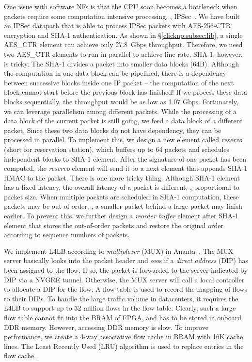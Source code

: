 One issue with software NFs is that the CPU soon becomes a bottleneck when packets require some
computation intensive processing, \eg, IPSec~\cite{packetshader}.
%
We have built an IPSec datapath that is able to process IPSec packets with AES-256-CTR encryption and SHA-1 authentication. 
As shown in \S\ref{clicknp:subsec:lib}, a single AES\_CTR element can achieve only 27.8~Gbps throughput. Therefore, we need two
AES\_CTR elements to run in parallel to achieve line rate.
SHA-1, however, is tricky. The SHA-1 divides a packet into smaller data blocks (64B). 
Although the computation in one data block can be pipelined, 
there is a dependency between successive blocks inside one IP packet -- the computation of the next block cannot start before the previous
block has finished! 
If we process these data blocks sequentially, the throughput would be as low as 1.07 Gbps. 
Fortunately, we can leverage parallelism among different packets. 
While the processing of a data block of the current packet is still going, we feed a data block of a different packet. 
Since these two data blocks do not have dependency, they can be processed in parallel. 
To implement this, we design a new element called \textit{reservo} (short for reservation station), which buffers up to 64 packets and schedules 
independent blocks to SHA-1 element. After the signature of one packet has been computed, the \textit{reservo} element will 
send it to a next element that appends SHA-1 HMAC to the packet.
%
There is one more tricky thing. 
Although SHA-1 element has a fixed latency, the overall latency of a packet is different, \ie, proportional to packet size. 
When multiple packets are scheduled in SHA-1 computation, these packets may be
out-of-order, \eg, a smaller packet behind a large packet may finish earlier.
%
To prevent this, we further design a \textit{reorder buffer} element after SHA-1 element
that stores the out-of-order packets and restore the original order
 according to sequence numbers of packets. 

 We implement L4LB according to \textit{multiplexer} (MUX) in Ananta~\cite{ananta}.
%
The MUX server basically looks into the packet header and sees if a \textit{direct address} (DIP) has been assigned to the flow.
If so, the packet is forwarded to the server indicated by DIP via a NVGRE tunnel. Otherwise, the MUX server will call a local controller to
allocate a DIP for the flow.
%
%
A flow table is used to record the mapping of flows to their DIPs.
%
To handle the large traffic volume in datacenters, it requires the L4LB to support up to 32 million flows in the flow table.
Clearly, such a large flow table cannot fit into the BRAM of FPGA, and has to be stored in onboard DDR memory.
However, accessing DDR memory is slow. 
To improve performance, we create a 4-way associative flow cache in BRAM with 16K 
cache lines. The Least Recently Used (LRU) algorithm is used to replace entries 
in the flow cache.

